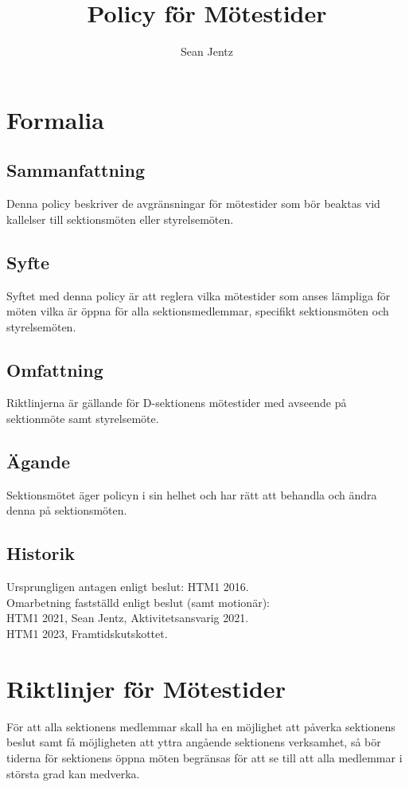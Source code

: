 \documentclass[]{dsekprotokoll}
\title{Policy för Mötestider}
\author{Sean Jentz}
\begin{document}
\section{Formalia}

\subsection{Sammanfattning}
Denna policy beskriver de avgränsningar för mötestider som bör beaktas vid kallelser till sektionsmöten eller styrelsemöten.

\subsection{Syfte}
Syftet med denna policy är att reglera vilka mötestider som anses lämpliga för möten vilka är öppna för alla sektionsmedlemmar, specifikt sektionsmöten och styrelsemöten.

\subsection{Omfattning}
Riktlinjerna är gällande för D-sektionens mötestider med avseende på sektionmöte samt styrelsemöte.

\subsection{Ägande}
Sektionsmötet äger policyn i sin helhet och har rätt att behandla och ändra denna på sektionsmöten.

\subsection{Historik}
Ursprungligen antagen enligt beslut: HTM1 2016. \\
Omarbetning fastställd enligt beslut (samt motionär): \\
HTM1 2021, Sean Jentz, Aktivitetsansvarig 2021. \\
HTM1 2023, Framtidskutskottet.

\section{Riktlinjer för Mötestider}
För att alla sektionens medlemmar skall ha en möjlighet att påverka sektionens beslut samt få möjligheten att yttra angående sektionens verksamhet, så bör tiderna för sektionens öppna möten begränsas för att se till att alla medlemmar i största grad kan medverka.
\end{document}
